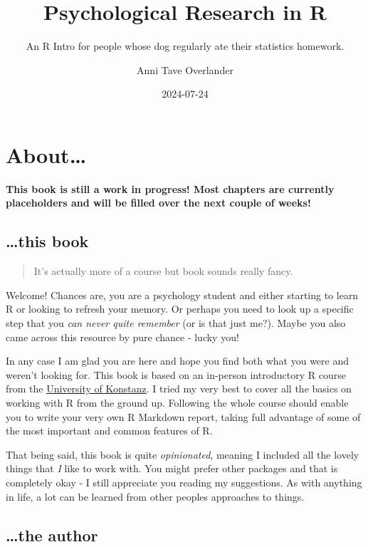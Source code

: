 \documentclass[
]{book}
\title{Psychological Research in R}
\subtitle{An R Intro for people whose dog regularly ate their statistics homework.}
\author{Anni Tave Overlander}
\date{2024-07-24}
\begin{document}
\maketitle

{
\setcounter{tocdepth}{1}
\tableofcontents
}
\chapter*{About\ldots{}}\label{about}

\textbf{This book is still a work in progress! Most chapters are currently placeholders and will be filled over the next couple of weeks!}

\section*{\ldots this book}\label{this-book}

\begin{quote}
It's actually more of a course but book sounds really fancy.
\end{quote}

Welcome!
Chances are, you are a psychology student and either starting to learn R or looking to refresh your memory.
Or perhaps you need to look up a specific step that you \emph{can never quite remember} (or is that just me?).
Maybe you also came across this resource by pure chance - lucky you!

In any case I am glad you are here and hope you find both what you were and weren't looking for.
This book is based on an in-person introductory R course from the \href{https://www.uni-konstanz.de/}{University of Konstanz}.
I tried my very best to cover all the basics on working with R from the ground up.
Following the whole course should enable you to write your very own R Markdown report, taking full advantage of some of the most important and common features of R.

That being said, this book is quite \emph{opinionated}, meaning I included all the lovely things that \emph{I} like to work with.
You might prefer other packages and that is completely okay - I still appreciate you reading my suggestions.
As with anything in life, a lot can be learned from other peoples approaches to things.

\section*{\ldots the author}\label{the-author}
\end{document}
